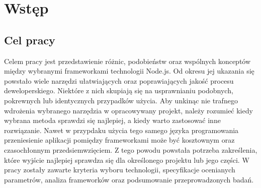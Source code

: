 \documentclass[12pt]{report}
\begin{document}
\tableofcontents

\chapter{Wstęp}

  \section{Cel pracy}
  Celem pracy jest przedstawienie różnic, podobieństw oraz wspólnych konceptów między wybranymi frameworkami technologii Node.js. 
  Od okresu jej ukazania się powstało wiele narzędzi ułatwiających oraz poprawiających jakość procesu deweloperskiego. 
  Niektóre z nich skupiają się na usprawnianiu podobnych, pokrewnych lub identycznych przypadków użycia.
  Aby unkinąc nie trafnego wdrożenia wybranego narzędzia w opracowywany projekt, należy rozumieć kiedy wybrana metoda sprawdzi się najlepiej, a kiedy warto zastosować inne rozwiązanie.
  Nawet w przypdaku użycia tego samego języka programowania przeniesienie aplikacji pomiędzy frameworkami może być kosztownym oraz czasochłonnym przedsiemwzięciem.
  Z tego powodu powstała potrzeba zakreślenia, które wyjście najlepiej sprawdza się dla określonego projektu lub jego części.
  W pracy zostały zawarte kryteria wyboru technologii, specyfikacje ocenianych parametrów, analiza frameworków oraz podsumowanie przeprowadzonych badań.
\end{document}
